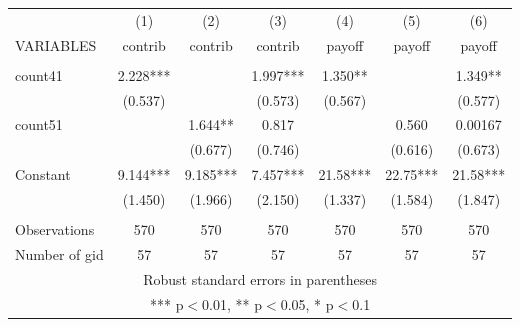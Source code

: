 \documentclass[]{article}
\begin{document}
\begin{tabular}{lcccccc} \hline
 & (1) & (2) & (3) & (4) & (5) & (6) \\
VARIABLES & contrib & contrib & contrib & payoff & payoff & payoff \\ \hline
 &  &  &  &  &  &  \\
count41 & 2.228*** &  & 1.997*** & 1.350** &  & 1.349** \\
 & (0.537) &  & (0.573) & (0.567) &  & (0.577) \\
count51 &  & 1.644** & 0.817 &  & 0.560 & 0.00167 \\
 &  & (0.677) & (0.746) &  & (0.616) & (0.673) \\
Constant & 9.144*** & 9.185*** & 7.457*** & 21.58*** & 22.75*** & 21.58*** \\
 & (1.450) & (1.966) & (2.150) & (1.337) & (1.584) & (1.847) \\
 &  &  &  &  &  &  \\
Observations & 570 & 570 & 570 & 570 & 570 & 570 \\
 Number of gid & 57 & 57 & 57 & 57 & 57 & 57 \\ \hline
\multicolumn{7}{c}{ Robust standard errors in parentheses} \\
\multicolumn{7}{c}{ *** p$<$0.01, ** p$<$0.05, * p$<$0.1} \\
\end{tabular}
\end{document}
